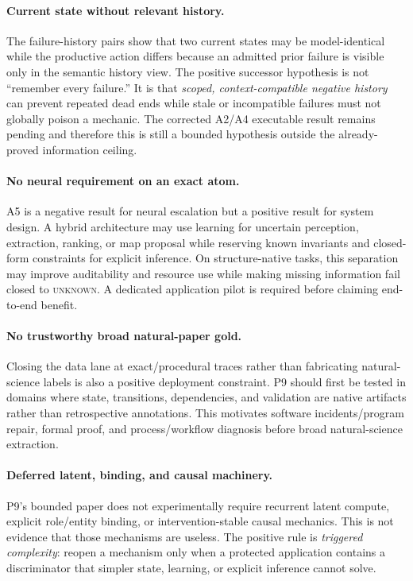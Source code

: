 \paragraph{Current state without relevant history.}
The failure-history pairs show that two current states may be model-identical while the productive action differs because an admitted prior failure is visible only in the semantic history view. The positive successor hypothesis is not ``remember every failure.'' It is that \emph{scoped, context-compatible negative history} can prevent repeated dead ends while stale or incompatible failures must not globally poison a mechanic. The corrected A2/A4 executable result remains pending and therefore this is still a bounded hypothesis outside the already-proved information ceiling.

\paragraph{No neural requirement on an exact atom.}
A5 is a negative result for neural escalation but a positive result for system design. A hybrid architecture may use learning for uncertain perception, extraction, ranking, or map proposal while reserving known invariants and closed-form constraints for explicit inference. On structure-native tasks, this separation may improve auditability and resource use while making missing information fail closed to \textsc{unknown}. A dedicated application pilot is required before claiming end-to-end benefit.

\paragraph{No trustworthy broad natural-paper gold.}
Closing the data lane at exact/procedural traces rather than fabricating natural-science labels is also a positive deployment constraint. P9 should first be tested in domains where state, transitions, dependencies, and validation are native artifacts rather than retrospective annotations. This motivates software incidents/program repair, formal proof, and process/workflow diagnosis before broad natural-science extraction.

\paragraph{Deferred latent, binding, and causal machinery.}
P9's bounded paper does not experimentally require recurrent latent compute, explicit role/entity binding, or intervention-stable causal mechanics. This is not evidence that those mechanisms are useless. The positive rule is \emph{triggered complexity}: reopen a mechanism only when a protected application contains a discriminator that simpler state, learning, or explicit inference cannot solve.

